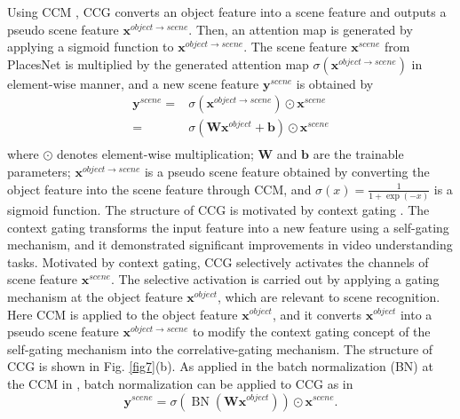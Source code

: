 \documentclass[journal,comsoc]{IEEEtran}
\begin{document}
Using CCM \cite{b21}, CCG converts an object feature into a scene feature and outputs a pseudo scene feature ${{\bm{x}}^{object \to scene}}$. Then, an attention map is generated by applying a sigmoid function to ${{\bm{x}}^{object \to scene}}$. The scene feature ${{\bm{x}}^{scene}}$ from PlacesNet is multiplied by the generated attention map $\sigma \left( {{{\bm{x}}^{object \to scene}}} \right)$ in element-wise manner, and a new scene feature ${{\bm{y}}^{scene}}$ is obtained by
\begin{equation}
\begin{aligned}
  {{\bm{y}}^{scene}} = {} & \sigma \left( {{{\bm{x}}^{object \to scene}}} \right) \odot {{\bm{x}}^{scene}} \\ 
   = & \sigma \left( {{\bm{W}}{{\bm{x}}^{object}} + {\bm{b}}} \right) \odot {{\bm{x}}^{scene}} \\ 
\end{aligned} 
\label{eq11}
\end{equation}
where $\odot$ denotes element-wise multiplication; $\bm{W}$ and $\bm{b}$ are the trainable parameters; ${{\bm{x}}^{object \to scene}}$ is a pseudo scene feature obtained by converting the object feature into the scene feature through CCM, and $\sigma \left( x \right) = \frac{1}{{1 + \exp \left( { - x} \right)}}$ is a sigmoid function.
The structure of CCG is motivated by context gating \cite{b22}. The context gating transforms the input feature into a new feature using a self-gating mechanism, and it demonstrated significant improvements in video understanding tasks. Motivated by context gating, CCG selectively activates the channels of scene feature ${{\bm{x}}^{scene}}$. The selective activation is carried out by applying a gating mechanism at the object feature ${{\bm{x}}^{object}}$, which are relevant to scene recognition. Here CCM \cite{b21} is applied to the object feature ${{\bm{x}}^{object}}$, and it converts ${{\bm{x}}^{object}}$ into a pseudo scene feature ${{\bm{x}}^{object \to scene}}$ to modify the context gating concept of the self-gating mechanism into the correlative-gating mechanism. The structure of CCG is shown in Fig. \ref{fig7}(b). As applied in the batch normalization (BN) \cite{b32} at the CCM in \cite{b21}, batch normalization can be applied to CCG as in 
\begin{equation}
{{\bm{y}}^{scene}} = \sigma \left( {\operatorname{BN} \left( {{\bm{W}}{{\bm{x}}^{object}}} \right)} \right) \odot {{\bm{x}}^{scene}}
\label{eq12}
.
\end{equation}
\end{document}
